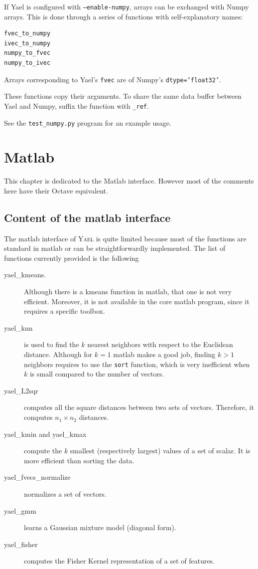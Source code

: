 \documentclass[a4paper,11pt,notitlepage,final,twoside]{report}
\newcommand{\yael}{\textsc{Yael}\xspace}
\newcommand{\tc}[1]{\texttt{#1}}
\begin{document}
If Yael is configured with \tc{--enable-numpy}, arrays can be
exchanged with Numpy arrays. This is done through a series of functions with self-explanatory names: 

\begin{verbatim}
fvec_to_numpy 
ivec_to_numpy 
numpy_to_fvec 
numpy_to_ivec 
\end{verbatim}

Arrays corresponding to Yael's \tc{fvec} are of Numpy's \tc{dtype='float32'}.  

These functions copy their arguments. To share the same data buffer between Yael and Numpy, suffix the function with \tc{\_ref}. 

See the \tc{test\_numpy.py} program for an example usage. 

\chapter{Matlab}

This chapter is dedicated to the Matlab interface. 
However most of the comments here have their Octave equivalent. 

\section{Content of the matlab interface}

The matlab interface of \yael is quite limited because most 
of the functions are standard in matlab or can be straightforwardly 
implemented. 
The list of functions currently provided is the following
\begin{description}
\item  [yael\_kmeans.] Although there is a kmeans function in matlab, 
that one is not very efficient. Moreover, it is not available in 
the core matlab program, since it requires a specific toolbox. 
\item [yael\_knn] is used to find the $k$ nearest neighbors with respect 
to the Euclidean distance. Although for $k=1$ matlab makes a good job, 
finding $k>1$ neighbors requires to use the \tc{sort} 
function, which is very inefficient when $k$ is small compared to the number 
of vectors. 
\item [yael\_L2sqr] computes all the square distances between two sets of vectors. 
Therefore, it computes $n_1\times n_2$ distances. 
\item [yael\_kmin and yael\_kmax] compute the $k$ smallest (respectively largest) 
values of a set of scalar. It is more efficient than sorting the data. 
\item [yael\_fvecs\_normalize] normalizes a set of vectors. 
\item [yael\_gmm] learns a Gaussian mixture model (diagonal form).
\item [yael\_fisher] computes the Fisher Kernel representation of a set of features. 
\end{description}
\end{document}
